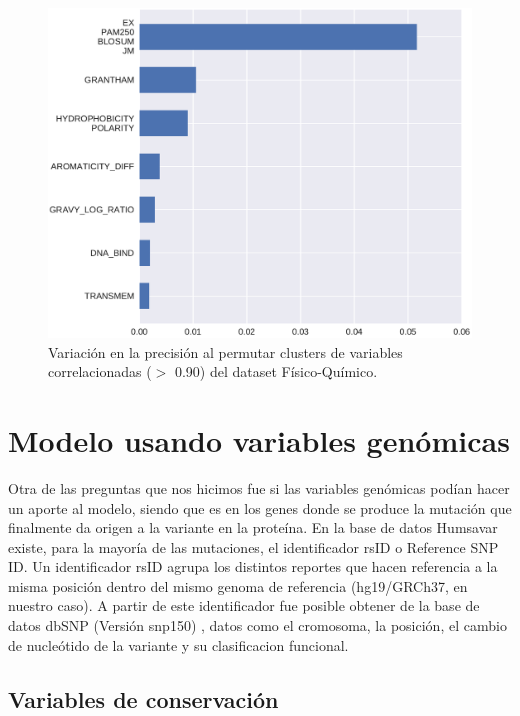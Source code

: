 \newpage

\begin{figure}[H]
    \centering
    \includegraphics[scale=0.6]{documents/latex/figures/3/structural/structural_importance_cluster.pdf}
    \caption{Variación en la precisión al permutar clusters de variables correlacionadas ($>$ 0.90) del dataset Físico-Químico.}
    \label{fig:importances_structural_cluster}
\end{figure}


\section{Modelo usando variables genómicas}

Otra de las preguntas que nos hicimos fue si las variables genómicas podían hacer un aporte al modelo, siendo que es en los genes donde se produce la mutación que finalmente da origen a la variante en la proteína. En la base de datos Humsavar existe, para la mayoría de las mutaciones, el identificador rsID o Reference SNP ID. Un identificador rsID agrupa los distintos reportes que hacen referencia a la misma posición dentro del mismo genoma de referencia (hg19/GRCh37, en nuestro caso). A partir de este identificador fue posible obtener de la base de datos dbSNP (Versión snp150) \cite{dbSNP}, datos como el cromosoma, la posición, el cambio de nucleótido de la variante y su clasificacion funcional.

\subsection{Variables de conservación}


